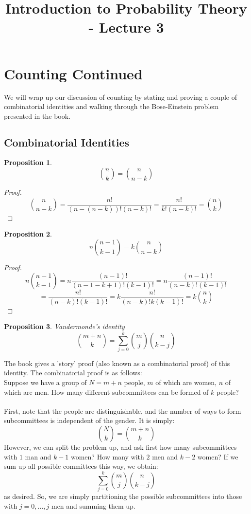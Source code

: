 \documentclass[12pt]{article} %
\date{}
\title{Introduction to Probability Theory - Lecture 3}
\newtheorem{prop}{Proposition}
\begin{document}
\maketitle
\section{Counting Continued}
We will wrap up our discussion of counting by stating and proving a couple of combinatorial identities and walking through the Bose-Einstein problem presented in the book.
\subsection{Combinatorial Identities}
\begin{prop}
$${n\choose {k}} = {n\choose{n-k}}$$
\end{prop}
\begin{proof}
$${n\choose{n-k}} = \frac{n!}{(n-(n-k))!(n-k)!} = \frac{n!}{k!(n-k)!} = {n\choose{k}}$$
\end{proof}
\begin{prop}
$$n{{n-1}\choose{k-1}} = k{n\choose{n-k}}$$
\end{prop}
\begin{proof}
$$n{{n-1}\choose{k-1}} = n\frac{(n-1)!}{(n-1-k+1)!(k-1)!} = n\frac{(n-1)!}{(n-k)!(k-1)!} $$
$$= \frac{n!}{(n-k)!(k-1)!} = k\frac{n!}{(n-k)!k(k-1)!}= k{n\choose{k}}$$
\end{proof}
\begin{prop}{Vandermonde's identity}
$${{m+n}\choose{k}} = \sum_{j=0}^k{m\choose{j}}{n\choose{k-j}}$$
\end{prop}
The book gives a 'story' proof (also known as a combinatorial proof) of this identity. The combinatorial proof is as follows:\\

Suppose we have a group of $N=m+n$ people, $m$ of which are women, $n$ of which are men. How many different subcommittees can be formed of $k$ people?\\\\
First, note that the people are distinguishable, and the number of ways to form subcommittees is independent of the gender. It is simply:
$${{N}\choose{k}} = {{m+n}\choose{k}}$$
However, we can split the problem up, and ask first how many subcommittees with $1$ man and $k-1$ women? How many with $2$ men and $k-2$ women? If we sum up all possible committees this way, we obtain:
$$\sum_{j=0}^k {m\choose{j}}{n\choose{k-j}}$$
as desired. So, we are simply partitioning the possible subcommittees into those with $j=0,...,j$ men and summing them up. 
\end{document}

